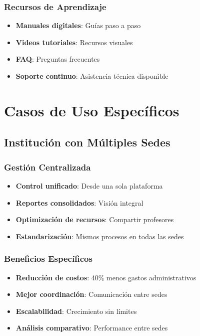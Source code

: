 \documentclass[12pt,a4paper]{article}
\begin{document}
\subsubsection{Recursos de Aprendizaje}
\begin{itemize}
    \item \textbf{Manuales digitales}: Guías paso a paso
    \item \textbf{Videos tutoriales}: Recursos visuales
    \item \textbf{FAQ}: Preguntas frecuentes
    \item \textbf{Soporte continuo}: Asistencia técnica disponible
\end{itemize}

\section{Casos de Uso Específicos}

\subsection{Institución con Múltiples Sedes}

\subsubsection{Gestión Centralizada}
\begin{itemize}
    \item \textbf{Control unificado}: Desde una sola plataforma
    \item \textbf{Reportes consolidados}: Visión integral
    \item \textbf{Optimización de recursos}: Compartir profesores
    \item \textbf{Estandarización}: Mismos procesos en todas las sedes
\end{itemize}

\subsubsection{Beneficios Específicos}
\begin{itemize}
    \item \textbf{Reducción de costos}: 40\% menos gastos administrativos
    \item \textbf{Mejor coordinación}: Comunicación entre sedes
    \item \textbf{Escalabilidad}: Crecimiento sin límites
    \item \textbf{Análisis comparativo}: Performance entre sedes
\end{itemize}
\end{document}
